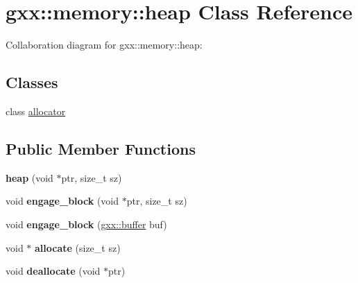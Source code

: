\hypertarget{classgxx_1_1memory_1_1heap}{}\section{gxx\+:\+:memory\+:\+:heap Class Reference}
\label{classgxx_1_1memory_1_1heap}


Collaboration diagram for gxx\+:\+:memory\+:\+:heap\+:
\subsection*{Classes}
\begin{DoxyCompactItemize}
\item 
class \hyperlink{classgxx_1_1memory_1_1heap_1_1allocator}{allocator}
\end{DoxyCompactItemize}
\subsection*{Public Member Functions}
\begin{DoxyCompactItemize}
\item 
{\bfseries heap} (void $\ast$ptr, size\+\_\+t sz)\hypertarget{classgxx_1_1memory_1_1heap_a0a4f3b468b22a2af98463f1eae1aa1d0}{}\label{classgxx_1_1memory_1_1heap_a0a4f3b468b22a2af98463f1eae1aa1d0}

\item 
void {\bfseries engage\+\_\+block} (void $\ast$ptr, size\+\_\+t sz)\hypertarget{classgxx_1_1memory_1_1heap_a09d94b4b71db2a4ebbb6fe8dd62b57eb}{}\label{classgxx_1_1memory_1_1heap_a09d94b4b71db2a4ebbb6fe8dd62b57eb}

\item 
void {\bfseries engage\+\_\+block} (\hyperlink{classgxx_1_1buffer}{gxx\+::buffer} buf)\hypertarget{classgxx_1_1memory_1_1heap_a1a56d4f0bd315d2d6bb7b676e40885a7}{}\label{classgxx_1_1memory_1_1heap_a1a56d4f0bd315d2d6bb7b676e40885a7}

\item 
void $\ast$ {\bfseries allocate} (size\+\_\+t sz)\hypertarget{classgxx_1_1memory_1_1heap_ae9164b3dd16fc7866777903e69e00e1e}{}\label{classgxx_1_1memory_1_1heap_ae9164b3dd16fc7866777903e69e00e1e}

\item 
void {\bfseries deallocate} (void $\ast$ptr)\hypertarget{classgxx_1_1memory_1_1heap_aa77eb9a99eccf590f1a3243cc09badf3}{}\label{classgxx_1_1memory_1_1heap_aa77eb9a99eccf590f1a3243cc09badf3}

\end{DoxyCompactItemize}
